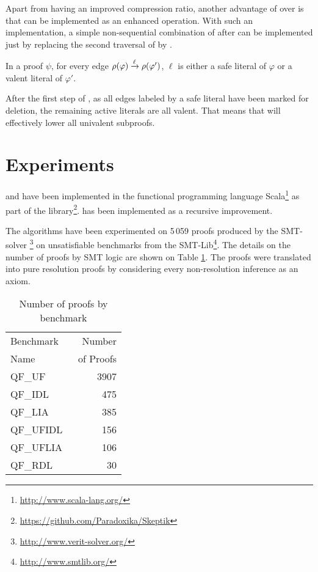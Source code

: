 \documentclass{llncs}
\begin{document}
Apart from having an improved compression ratio, another advantage of {\LowerUnivalents} over
{\LowerUnits} is that {\LowerUnivalents} can be implemented as an enhanced 
operation. With such an implementation, a simple non-sequential combination of {\LowerUnivalents}
after {\RPI} can be implemented just by replacing the second traversal of {\RPI} by
{\LowerUnivalents}.

\begin{proposition} \label{prop:LunivRPI}
In a proof $\psi$, for every edge $\rho(\varphi) \xrightarrow{\ell} \rho(\varphi')$, $\ell$ is either a safe literal
of $\varphi$ or a valent literal of $\varphi'$.
\end{proposition}

After the first step of {\RPI}, as all edges labeled by a safe literal have been marked for
deletion, the remaining active literals are all valent. That means that {\LowerUnivalents} will
effectively lower all univalent subproofs.



\section{Experiments} \label{sec:exp}

{\LowerUnivalents} and {\LUnivRPI} have been implemented in the functional programming
language Scala\footnote{\url{http://www.scala-lang.org/}} as part of the \skeptik
library\footnote{\url{https://github.com/Paradoxika/Skeptik}}. {\LowerUnivalents} has been implemented as a
recursive  improvement.

The algorithms have been experimented on 5\,059 proofs produced by the SMT-solver
{\veriT}\footnote{\url{http://www.verit-solver.org/}} on unsatisfiable benchmarks from the
SMT-Lib\footnote{\url{http://www.smtlib.org/}}.  The details on the number of proofs by SMT logic
are shown on Table \ref{tab:benchmarks}.  The proofs were translated into pure resolution proofs by
considering every non-resolution inference as an axiom.

\begin{table}[tb]
  \caption{Number of proofs by benchmark}
  \label{tab:benchmarks}
  \centering
  \begin{tabular}{lr}
    \toprule
    Benchmark~ &  Number \\
    Name       & ~of Proofs \\
    \midrule
    QF\_UF      & 3907 \\
    QF\_IDL     &  475 \\
    QF\_LIA     &  385 \\
    QF\_UFIDL   &  156 \\
    QF\_UFLIA   &  106 \\
    QF\_RDL     &   30 \\
    \bottomrule
  \end{tabular}
\end{table}
\end{document}
